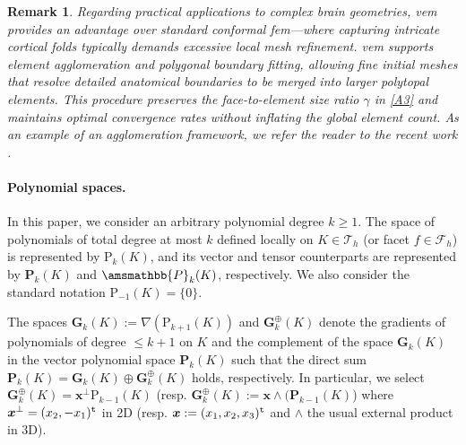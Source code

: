 \documentclass[fleqn,a4paper]{cas-sc}
\newcommand\bcurl{\mathop{\mathbf{curl}}\nolimits}
\newcommand\brot{\mathop{\mathbf{rot}}\nolimits}
\newcommand{\bx}{\boldsymbol{x}}
\newcommand{\0}{\boldsymbol{0}}
\newcommand\cT{\mathcal{T}}
\newcommand\cF{\mathcal{F}}
\newcommand\bP{\mathbf{P}}
\newcommand\bG{\mathbf{G}}
\newcommand\rP{\mathrm{P}}
\newcommand\bbP{\amsmathbb{P}}
\numberwithin{equation}{section}
\numberwithin{figure}{section}
\newtheorem{remark}{Remark}[section]
\begin{document}
\begin{remark}
    {Regarding practical applications to complex brain geometries, \gls{vem} provides an  advantage over standard conformal \gls{fem}—where capturing intricate cortical folds typically demands excessive local mesh refinement. \gls{vem}   supports element agglomeration and polygonal boundary fitting, allowing fine initial meshes that resolve detailed anatomical boundaries to be merged into larger polytopal elements. This procedure preserves the face-to-element size ratio $\gamma$ in \ref{A3} and maintains optimal convergence rates without inflating the global element count. As an example of an agglomeration framework, we refer the reader to the recent work \cite{antonietti26}.}
\end{remark}

\paragraph{Polynomial spaces.} In this paper, we consider an arbitrary polynomial degree $k\geq 1$. The space of polynomials of total degree at most $k$ defined locally on $K\in \cT_h$ (or facet $f\in \cF_h$) is represented by $\rP_k (K)$, and its vector and tensor counterparts are represented by $\bP_k(K)$ and $\bbP_k(K)$, respectively. We also consider the standard notation $\rP_{-1}(K)=\{0\}$. 

The spaces $\bG_k(K):= \nabla (\rP_{k+1}(K))$ and $\bG_k^\oplus(K)$ denote the gradients of polynomials of degree $\leq k+1$ on $K$ and the complement of the space $\bG_k(K)$ in the vector polynomial space $\bP_k(K)$ such that the direct sum $\bP_k(K) = \bG_k(K) \oplus  \bG_k^\oplus(K)$ holds, respectively. In particular, we select $\bG_k^\oplus(K)= \bx^\perp \rP_{k-1}(K)$ (resp. $\bG_k^\oplus(K):= \bx\wedge(\bP_{k-1}(K)$) where $\bx^\perp = (x_2,-x_1)^{\tt t}$ in 2D (resp. $\bx := (x_1,x_2,x_3)^{\tt t}$ and $\wedge$ the usual external product in 3D). 
\end{document}
